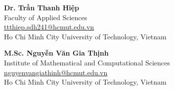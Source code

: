 \documentclass[margin]{res}
\begin{document}
\begin{resume}
  \par
  \textbf{Dr. Trần Thanh Hiệp}\\
  Faculty of Applied Sciences\\
  \href{mailto:ttthiep.sdh241@hcmut.edu.vn}{ttthiep.sdh241@hcmut.edu.vn}\\
  Ho Chi Minh City University of Technology, Vietnam
  
  \par
  \textbf{M.Sc. Nguyễn Văn Gia Thịnh}\\
  Institute of Mathematical and Computational Sciences\\
  \href{mailto:nguyenvangiathinh@hcmut.edu.vn}{nguyenvangiathinh@hcmut.edu.vn}\\
  Ho Chi Minh City University of Technology, Vietnam


\end{resume}
\end{document}
